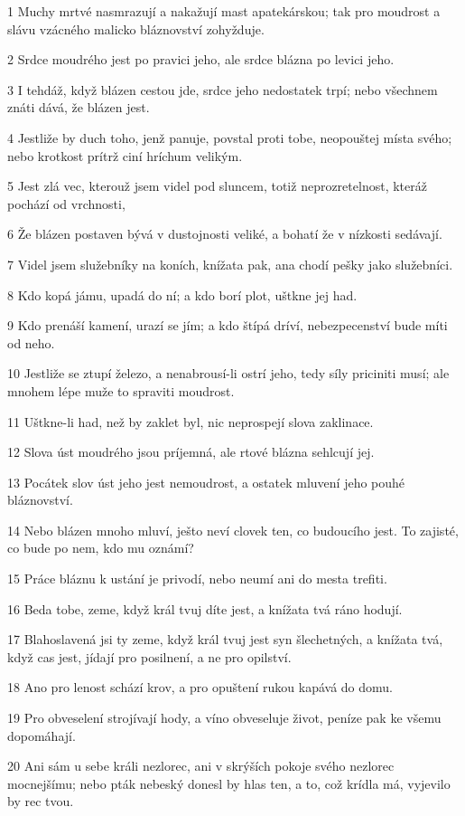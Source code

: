\par 1 Muchy mrtvé nasmrazují a nakažují mast apatekárskou; tak pro moudrost a slávu vzácného malicko bláznovství zohyžduje.
\par 2 Srdce moudrého jest po pravici jeho, ale srdce blázna po levici jeho.
\par 3 I tehdáž, když blázen cestou jde, srdce jeho nedostatek trpí; nebo všechnem znáti dává, že blázen jest.
\par 4 Jestliže by duch toho, jenž panuje, povstal proti tobe, neopouštej místa svého; nebo krotkost prítrž ciní hríchum velikým.
\par 5 Jest zlá vec, kterouž jsem videl pod sluncem, totiž neprozretelnost, kteráž pochází od vrchnosti,
\par 6 Že blázen postaven bývá v dustojnosti veliké, a bohatí že v nízkosti sedávají.
\par 7 Videl jsem služebníky na koních, knížata pak, ana chodí pešky jako služebníci.
\par 8 Kdo kopá jámu, upadá do ní; a kdo borí plot, uštkne jej had.
\par 9 Kdo prenáší kamení, urazí se jím; a kdo štípá dríví, nebezpecenství bude míti od neho.
\par 10 Jestliže se ztupí železo, a nenabrousí-li ostrí jeho, tedy síly priciniti musí; ale mnohem lépe muže to spraviti moudrost.
\par 11 Uštkne-li had, než by zaklet byl, nic neprospejí slova zaklinace.
\par 12 Slova úst moudrého jsou príjemná, ale rtové blázna sehlcují jej.
\par 13 Pocátek slov úst jeho jest nemoudrost, a ostatek mluvení jeho pouhé bláznovství.
\par 14 Nebo blázen mnoho mluví, ješto neví clovek ten, co budoucího jest. To zajisté, co bude po nem, kdo mu oznámí?
\par 15 Práce bláznu k ustání je privodí, nebo neumí ani do mesta trefiti.
\par 16 Beda tobe, zeme, když král tvuj díte jest, a knížata tvá ráno hodují.
\par 17 Blahoslavená jsi ty zeme, když král tvuj jest syn šlechetných, a knížata tvá, když cas jest, jídají pro posilnení, a ne pro opilství.
\par 18 Ano pro lenost schází krov, a pro opuštení rukou kapává do domu.
\par 19 Pro obveselení strojívají hody, a víno obveseluje život, peníze pak ke všemu dopomáhají.
\par 20 Ani sám u sebe králi nezlorec, ani v skrýších pokoje svého nezlorec mocnejšímu; nebo pták nebeský donesl by hlas ten, a to, což krídla má, vyjevilo by rec tvou.

